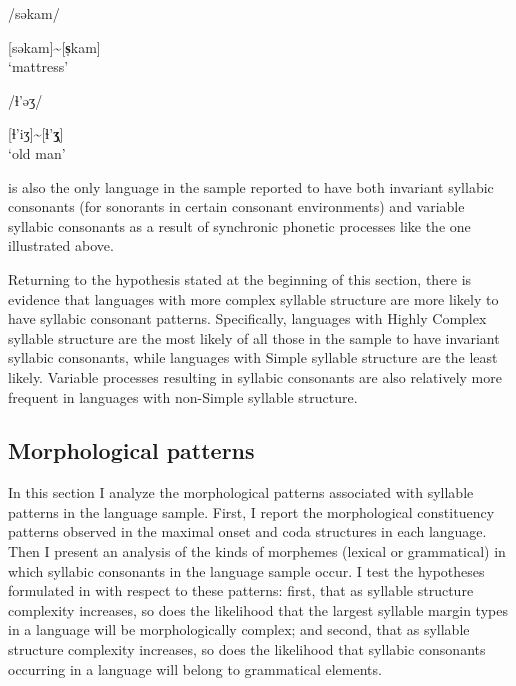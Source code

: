 \ea\label{ex:3.19}

/səkam/

[səkam]{\textasciitilde}[\textbf{s̩}kam]\\
\glt ‘mattress’
\citep[41]{Chang2006}
\z

\ea\label{ex:3.20}

/ɬ{}'əʒ/

[ɬ’iʒ]{\textasciitilde}[ɬ{}'\textbf{ʒ̩}]\\
\glt ‘old man’
\citep[24]{Kuipers1960}
\z

 is also the only language in the sample reported to have both invariant syllabic consonants (for sonorants in certain consonant environments) and variable syllabic consonants as a result of synchronic phonetic processes like the one illustrated above.

  Returning to the hypothesis stated at the beginning of this section, there is evidence that languages with more complex syllable structure are more likely to have syllabic consonant patterns. Specifically, languages with Highly Complex syllable structure are the most likely of all those in the sample to have invariant syllabic consonants, while languages with Simple syllable structure are the least likely. Variable processes resulting in syllabic consonants are also relatively more frequent in languages with non-Simple syllable structure.

\subsection{Morphological patterns}\label{sec:3.3.6}

  In this section I analyze the morphological patterns associated with syllable patterns in the language sample. First, I report the morphological constituency patterns observed in the maximal onset and coda structures in each language. Then I present an analysis of the kinds of morphemes (lexical or grammatical) in which syllabic consonants in the language sample occur. I test the hypotheses formulated in  with respect to these patterns: first, that as syllable structure complexity increases, so does the likelihood that the largest syllable margin types in a language will be morphologically complex; and second, that as syllable structure complexity increases, so does the likelihood that syllabic consonants occurring in a language will belong to grammatical elements.

